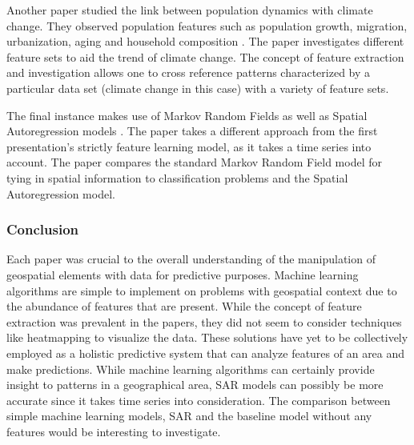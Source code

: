 \documentclass[12pt]{article}
\begin{document}
Another paper studied the link between population dynamics with climate change. They observed population features such as population growth, migration, urbanization, aging and household composition \cite{popdyn}. The paper investigates different feature sets to aid the trend of climate change. The concept of feature extraction and investigation allows one to cross reference patterns characterized by a particular data set (climate change in this case) with a variety of feature sets. 

The final instance makes use of Markov Random Fields as well as Spatial Autoregression models \cite{autoreg}. The paper takes a different approach from the first presentation's strictly feature learning model, as it takes a time series into account. The paper compares the standard Markov Random Field model for tying in spatial information to classification problems and the Spatial Autoregression model. 

\subsubsection{Conclusion}
Each paper was crucial to the overall understanding of the manipulation of geospatial elements with data for predictive purposes. Machine learning algorithms are simple to implement on problems with geospatial context due to the abundance of features that are present. While the concept of feature extraction was prevalent in the papers, they did not seem to consider techniques like heatmapping to visualize the data. These solutions have yet to be collectively employed as a holistic predictive system that can analyze features of an area and make predictions. While machine learning algorithms can certainly provide insight to patterns in a geographical area, SAR models can possibly be more accurate since it takes time series into consideration. The comparison between simple machine learning models, SAR and the baseline model without any features would be interesting to investigate. 

\end{document}
